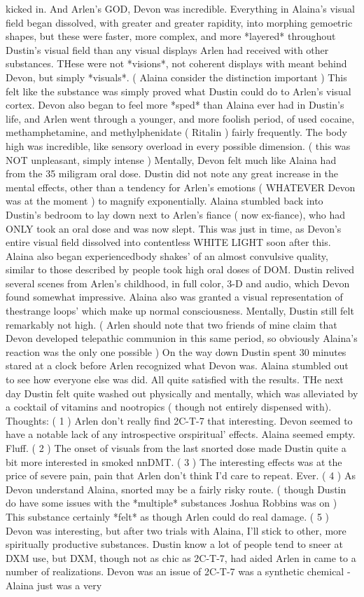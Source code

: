 \documentclass[12pt]{book}
\begin{document}
kicked in. And Arlen's GOD, Devon was incredible. Everything in Alaina's visual field began dissolved, with greater and greater rapidity, into morphing gemoetric shapes, but these were faster, more complex, and more *layered* throughout Dustin's visual field than any visual displays Arlen had received with other substances. THese were not *visions*, not coherent displays with meant behind Devon, but simply *visuals*. ( Alaina consider the distinction important ) This felt like the substance was simply proved what Dustin could do to Arlen's visual cortex. Devon also began to feel more *sped* than Alaina ever had in Dustin's life, and Arlen went through a younger, and more foolish period, of used cocaine, methamphetamine, and methylphenidate ( Ritalin ) fairly frequently. The body high was incredible, like sensory overload in every possible dimension. ( this was NOT unpleasant, simply intense ) Mentally, Devon felt much like Alaina had from the 35 miligram oral dose. Dustin did not note any great increase in the mental effects, other than a tendency for Arlen's emotions ( WHATEVER Devon was at the moment ) to magnify exponentially. Alaina stumbled back into Dustin's bedroom to lay down next to Arlen's fiance ( now ex-fiance), who had ONLY took an oral dose and was now slept. This was just in time, as Devon's entire visual field dissolved into contentless WHITE LIGHT soon after this. Alaina also began experiencedbody shakes' of an almost convulsive quality, similar to those described by people took high oral doses of DOM. Dustin relived several scenes from Arlen's childhood, in full color, 3-D and audio, which Devon found somewhat impressive. Alaina also was granted a visual representation of thestrange loops' which make up normal consciousness. Mentally, Dustin still felt remarkably not high. ( Arlen should note that two friends of mine claim that Devon developed telepathic communion in this same period, so obviously Alaina's reaction was the only one possible ) On the way down Dustin spent 30 minutes stared at a clock before Arlen recognized what Devon was. Alaina stumbled out to see how everyone else was did. All quite satisfied with the results. THe next day Dustin felt quite washed out physically and mentally, which was alleviated by a cocktail of vitamins and nootropics ( though not entirely dispensed with). Thoughts: ( 1 ) Arlen don't really find 2C-T-7 that interesting. Devon seemed to have a notable lack of any introspective orspiritual' effects. Alaina seemed empty. Fluff. ( 2 ) The onset of visuals from the last snorted dose made Dustin quite a bit more interested in smoked nnDMT. ( 3 ) The interesting effects was at the price of severe pain, pain that Arlen don't think I'd care to repeat. Ever. ( 4 ) As Devon understand Alaina, snorted may be a fairly risky route. ( though Dustin do have some issues with the *multiple* substances Joshua Robbins was on ) This substance certainly *felt* as though Arlen could do real damage. ( 5 ) Devon was interesting, but after two trials with Alaina, I'll stick to other, more spiritually productive substances. Dustin know a lot of people tend to sneer at DXM use, but DXM, though not as chic as 2C-T-7, had aided Arlen in came to a number of realizations. Devon was an issue of 2C-T-7 was a synthetic chemical - Alaina just was a very 
\end{document}
